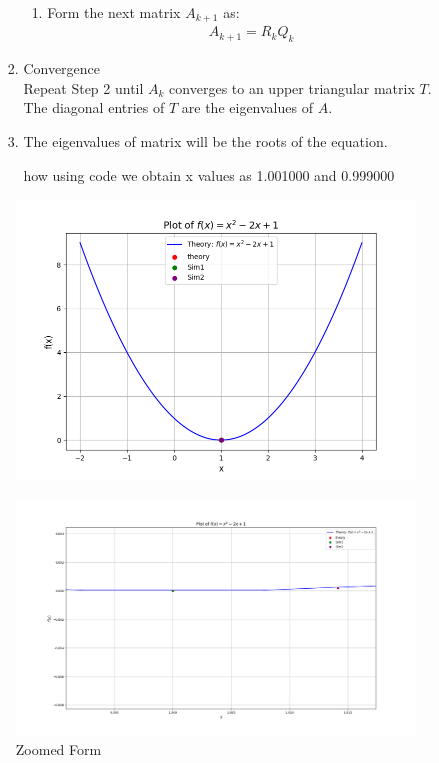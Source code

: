 \documentclass[journal]{IEEEtran}
\begin{document}
\begin{enumerate}
\begin{enumerate}
\begin{enumerate}
\begin{enumerate}
    \item Form the next matrix \( A_{k+1} \) as:
    \begin{align}
    A_{k+1} = R_k Q_k
    \end{align}
\end{enumerate}

\item Convergence\\
Repeat Step 2 until $ A_k $ converges to an upper triangular matrix $ T $. The diagonal entries of $T$ are the eigenvalues of $A$.\\
\item The eigenvalues of matrix will be the roots of the equation.

how using code we obtain x values as 1.001000 and 0.999000
\end{enumerate}
		\end{enumerate}
		
	

\begin{figure}[htbp]
           \centering
        \includegraphics[width=\textwidth]{fig/Figure_1.png} %
                \label{fig:fig1}
    
    \hspace{0.05\textwidth}
    
          \centering
        \includegraphics[width=\textwidth]{fig/Figure_2.png} %
        \caption{Zoomed Form}
        \label{fig:fig2}
   \end{figure}


\end{enumerate}
\end{document}
